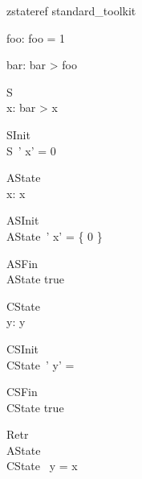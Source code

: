 
\begin{zsection}
   \SECTION zstateref \parents standard\_toolkit
\end{zsection}

\begin{axdef}
   foo: \nat
\where
   foo = 1
\end{axdef}

\begin{axdef}
   bar: \nat
\where
   bar > foo
\end{axdef}


\begin{schema}{S}
  \zstate \\
  x: \nat
\where
   bar > x
\end{schema}

\begin{schema}{SInit}
  \zstinit \\
   S~'
\where
   x' = 0
\end{schema}

\begin{schema}{AState}
  \zastate \\
   x: \power \nat
\where
  x \neq \emptyset
\end{schema}

\begin{schema}{ASInit}
  \zastinit \\
   AState~'
\where
   x' = \{ 0 \}
\end{schema}

\begin{schema}{ASFin}
  \zastfin \\
   AState
\where
   true
\end{schema}

\begin{schema}{CState}
  \zcstate \\
  y: \seq \nat
\where
   y \neq \langle \rangle
\end{schema}

\begin{schema}{CSInit}
  \zcstinit \\
   CState~'
\where
  y' =  \rangle
\end{schema}

\begin{schema}{CSFin}
  \zcstfin \\
   CState
\where
   true
\end{schema}

\begin{schema}{Retr}
  \zretrieve \\
   AState \\
   CState
\where
   \ran~y = x
\end{schema}

